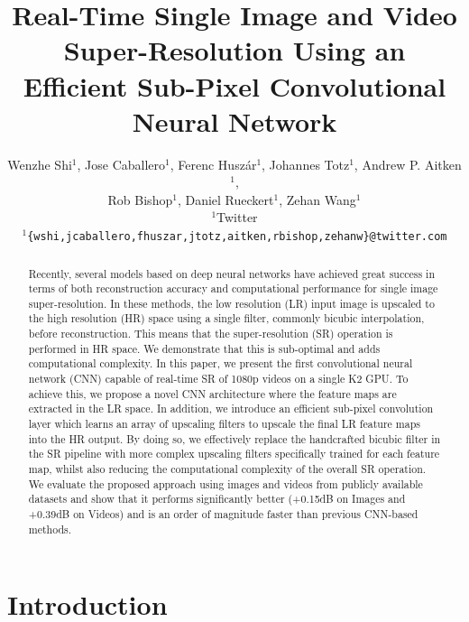 \documentclass[10pt,twocolumn,letterpaper]{article}
\begin{document}
\title{Real-Time Single Image and Video Super-Resolution Using an Efficient Sub-Pixel Convolutional Neural Network}

\onehalfspacing
\author{Wenzhe Shi$^1$, Jose Caballero$^1$, Ferenc Husz\'{a}r$^1$, Johannes Totz$^1$, Andrew P. Aitken$^1$, \\
        Rob Bishop$^1$, Daniel Rueckert$^1$, Zehan Wang$^1$\\
        $^1$Twitter\\
        {\tt\small $^1$\{wshi,jcaballero,fhuszar,jtotz,aitken,rbishop,zehanw\}@twitter.com}
}

\maketitle

\singlespacing
\begin{abstract}
Recently, several models based on deep neural networks have achieved great success in terms of both reconstruction accuracy and computational performance for single image super-resolution. In these methods, the low resolution (LR) input image is upscaled to the high resolution (HR) space using a single filter, commonly bicubic interpolation, before reconstruction. This means that the  super-resolution (SR) operation is performed in HR space. We demonstrate that this is sub-optimal and adds computational complexity. In this paper, we present the first convolutional neural network (CNN) capable of real-time SR of 1080p videos on a single K2 GPU. To achieve this, we propose a novel CNN architecture where the feature maps are extracted in the LR space. In addition, we introduce an efficient sub-pixel convolution layer which learns an array of upscaling filters to upscale the final LR feature maps into the HR output. By doing so, we effectively replace the handcrafted bicubic filter in the SR pipeline with more complex upscaling filters specifically trained for each feature map, whilst also reducing the computational complexity of the overall SR operation. We evaluate the proposed approach using images and videos from publicly available datasets and show that it performs significantly better (+0.15dB on Images and +0.39dB on Videos) and is an order of magnitude faster than previous CNN-based methods.
\end{abstract}

\section{Introduction}
\end{document}
